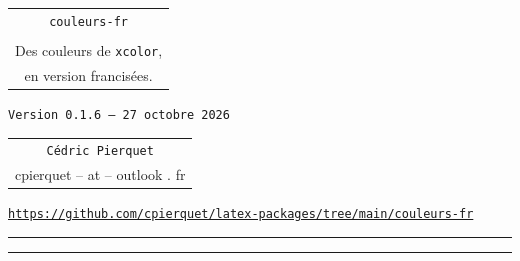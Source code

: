\documentclass[french,11pt,a4paper]{article}
\def\TPversion{0.1.6}
\def\TPdate{27 octobre 2026}
\begin{document}
\pagestyle{fancy}

\thispagestyle{empty}

\begin{center}
	\begin{minipage}{0.75\linewidth}
	\begin{tcolorbox}[colframe=yellow,colback=yellow!15]
		\begin{center}
			\begin{tabular}{c}
				{\Huge \texttt{couleurs-fr}}\\
				\\
				{\LARGE Des couleurs de \texttt{xcolor},} \\
				{\LARGE en version francisées.} \\
			\end{tabular}

			\medskip

			{\small \texttt{Version \TPversion{} -- \TPdate}}
		\end{center}
	\end{tcolorbox}
\end{minipage}
\end{center}

\begin{center}
	\begin{tabular}{c}
	\texttt{Cédric Pierquet}\\
	{\ttfamily cpierquet -- at -- outlook . fr}
\end{tabular}
\end{center}

\begin{center}
\begin{minipage}{0.85\linewidth}
	\begin{tcolorbox}[colframe=teal,colback=teal!10,halign=center,fontupper=\footnotesize]
		\texttt{\url{https://github.com/cpierquet/latex-packages/tree/main/couleurs-fr}}
	\end{tcolorbox}
\end{minipage}
\end{center}

\hrule


\hypertarget{matoc}{}

\tableofcontents

\vspace*{5mm}

\hrule

\vspace*{5mm}
\end{document}

